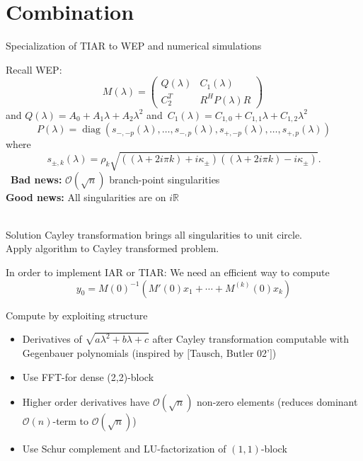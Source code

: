 \documentclass{beamer}
\newcommand{\RR}{\mathbb{R}}
\newcommand{\diag}{\operatorname{diag}}
\newcommand{\mycite}[1]{$[$#1$]$}
\begin{document}
\section{Combination}
\begin{specialframe}{}
\begin{block}{\vspace*{-3ex}}
 \begin{center}
    \fontsize{30}{36}\selectfont Specialization of TIAR to WEP and numerical simulations
\end{center}
\end{block}
\end{specialframe}


\begin{frame}{}%
Recall WEP: \[
  M(\lambda)=
  \begin{pmatrix}
    Q(\lambda) 	& C_1(\lambda)	\\
    C_2^T 	& R^HP(\lambda)R
  \end{pmatrix}\
\]
 and $Q(\lambda)=A_0+A_1\lambda+A_2\lambda^2$ and~$C_1(\lambda)=C_{1,0}+C_{1,1}\lambda+C_{1,2}\lambda^2$ 
 \[
   P(\lambda)=
 \diag(s_{-,-p}(\lambda),\ldots,s_{-,p}(\lambda),
 s_{+,-p}(\lambda),\ldots,s_{+,p}(\lambda))
 \]
where 
\[
s_{\pm,k}(\lambda)=\rho_k \sqrt{((\lambda+2i\pi k)+i\kappa_\pm)((\lambda+2i\pi k)-i\kappa_\pm)}.
\]\
{\bf Bad news:} $\mathcal{O}(\sqrt{n})$ branch-point  singularities~\\
{\bf Good news:} All singularities are on $i\RR$~\\\
\begin{block}{Solution}
Cayley transformation brings all singularities to unit circle. ~\\
Apply algorithm to Cayley transformed problem.
\end{block}
\end{frame}

\begin{frame}
In order to implement IAR or TIAR: We need an efficient way to compute
\[
y_0=M(0)^{-1}(M'(0)x_1+\cdots+M^{(k)}(0)x_k)
\]
\begin{block}{Compute by exploiting structure}
\begin{itemize}
  \item Derivatives of $\sqrt{a\lambda^2+b\lambda+c}$ after Cayley transformation computable with Gegenbauer polynomials (inspired by \mycite{Tausch, Butler 02'})
  \item Use FFT-for dense (2,2)-block
  \item Higher order derivatives have $\mathcal{O}(\sqrt{n})$ non-zero
elements (reduces dominant $\mathcal{O}(n)$-term to $\mathcal{O}(\sqrt{n})$)
  \item Use Schur complement and LU-factorization of $(1,1)$-block
\end{itemize}
\end{block}
\end{frame}
\end{document}
